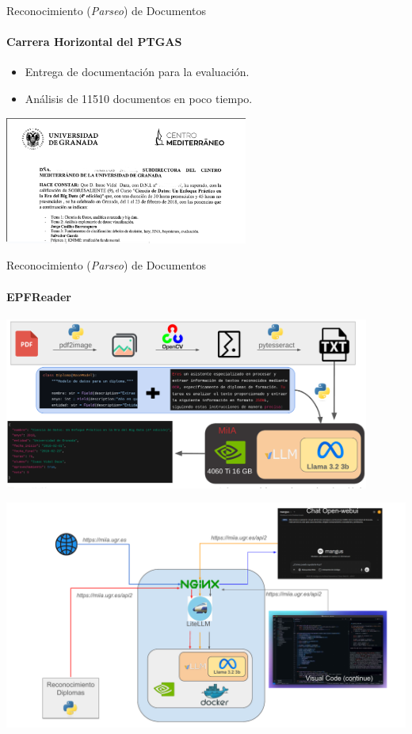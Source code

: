 \documentclass[aspectratio=169]{beamer}
\begin{document}
\begin{frame}{Reconocimiento (\textit{Parseo}) de Documentos}
    \framesubtitle{Carrera Horizontal del PTGAS}
    \begin{itemize}
        \item Entrega de documentación para la evaluación.
        \item Análisis de 11510 documentos en poco tiempo.
    \end{itemize}
    \begin{center}
        \includegraphics[width=8cm]{imagenes/cienciaDatos.png}
    \end{center}
\end{frame}

\begin{frame}{Reconocimiento (\textit{Parseo}) de Documentos}
    \framesubtitle{EPFReader}
        \begin{center}
            \includegraphics[width=12cm]{imagenes/epf.png}
        \end{center}
\end{frame}

\begin{frame}
        \begin{center}
            \includegraphics[width=14cm]{imagenes/MiIA_completo.pdf}
        \end{center}
\end{frame}
\end{document}

